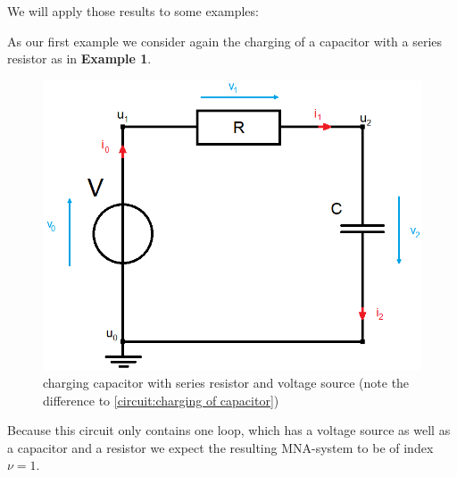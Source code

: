 We will apply those results to some examples: 

\begin{example1}
	\label{ex:Index_Analysis}
	As our first example we consider again the charging of a capacitor with a series resistor as in \textbf{Example 1}.
	\begin{figure}[H]
		\centering
		\includegraphics[scale = 0.4]{pictures/Example1_simple_p2.png}
		\caption{charging capacitor with series resistor and voltage source (note the difference to \ref{circuit:charging of capacitor})} 
	\end{figure}
	Because this circuit only contains one loop, which has a voltage source as well as a capacitor and a resistor we expect the resulting MNA-system to be of index $\nu=1$. 
	

\end{example1}
